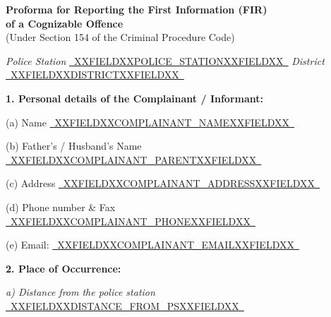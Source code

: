 \documentclass[12pt, a4paper]{article}
\newcommand{\fillline}[1]{\underline{~#1~}}
\begin{document}
\begin{center}
    {\large \textbf{Proforma for Reporting the First Information (FIR)}} \\[4pt]
    {\large \textbf{of a Cognizable Offence}} \\[2pt]
    {\small (Under Section 154 of the Criminal Procedure Code)} \\[6pt]
\end{center}

\vspace{6pt}

\noindent
\textit{Police Station} \fillline{XXFIELDXXPOLICE_STATIONXXFIELDXX} \hspace{2cm} \textit{District} \fillline{XXFIELDXXDISTRICTXXFIELDXX}

\vspace{10pt}

\noindent\textbf{1. Personal details of the Complainant / Informant:}

\vspace{6pt}
\hspace{1cm}(a) Name \fillline{XXFIELDXXCOMPLAINANT_NAMEXXFIELDXX}

\vspace{8pt}
\hspace{1cm}(b) Father's / Husband's Name \fillline{XXFIELDXXCOMPLAINANT_PARENTXXFIELDXX}

\vspace{8pt}
\hspace{1cm}(c) Address \fillline{XXFIELDXXCOMPLAINANT_ADDRESSXXFIELDXX}

\vspace{8pt}
\hspace{1cm}(d) Phone number \& Fax \fillline{XXFIELDXXCOMPLAINANT_PHONEXXFIELDXX}

\vspace{8pt}
\hspace{1cm}(e) Email: \fillline{XXFIELDXXCOMPLAINANT_EMAILXXFIELDXX}

\vspace{12pt}

\noindent\textbf{2. Place of Occurrence:}

\vspace{6pt}
\hspace{1cm}\textit{a) Distance from the police station} \fillline{XXFIELDXXDISTANCE_FROM_PSXXFIELDXX}
\end{document}
